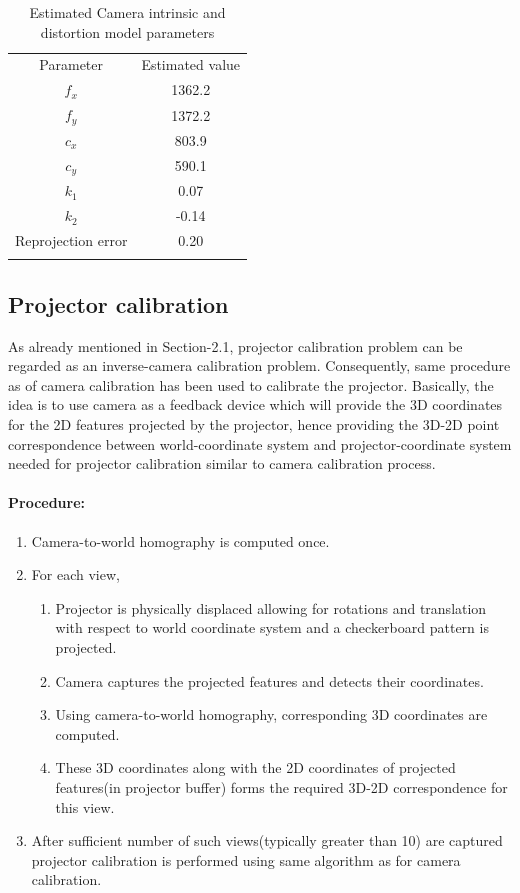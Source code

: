 \begin{table}[hb]  
\centering  
\begin{tabular}{c c}  
\hline\noalign{\smallskip}  
Parameter & Estimated value \\  
\noalign{\smallskip}\hline\noalign{\smallskip}  
$f_x$ & 1362.2\\  
$f_y$ & 1372.2\\  
$c_x$ & 803.9\\  
$c_y$ & 590.1\\  
$k_1$ & 0.07\\  
$k_2$ & -0.14\\  
Reprojection error & 0.20 \\  
\noalign{\smallskip}\hline  
\end{tabular}  
\caption{Estimated Camera intrinsic and distortion model parameters}  
\end{table}   
\subsection{Projector calibration}  
As already mentioned in Section-2.1, projector calibration problem can be regarded as an inverse-camera calibration problem. Consequently, same procedure as of camera calibration has been used to calibrate the projector. Basically, the idea is to use camera as a feedback device which will provide the 3D coordinates for the 2D features projected by the projector, hence providing the 3D-2D point correspondence between world-coordinate system and projector-coordinate system needed for projector calibration similar to camera calibration process.  
  
\paragraph{Procedure:}  
\begin{enumerate}
\item Camera-to-world homography is computed once.
\item For each view,
\begin{enumerate}
\item Projector is physically displaced allowing for rotations and translation with respect to world coordinate system and a checkerboard pattern is projected.  
\item Camera captures the projected features and detects their coordinates. 
\item Using camera-to-world homography, corresponding 3D coordinates are computed.  
\item These 3D coordinates along with the 2D coordinates of projected features(in projector buffer) forms the required 3D-2D correspondence for this view. 
\end{enumerate}
\item After sufficient number of such views(typically greater than 10) are captured projector calibration is performed using same algorithm as for camera calibration.  
\end{enumerate}
  
